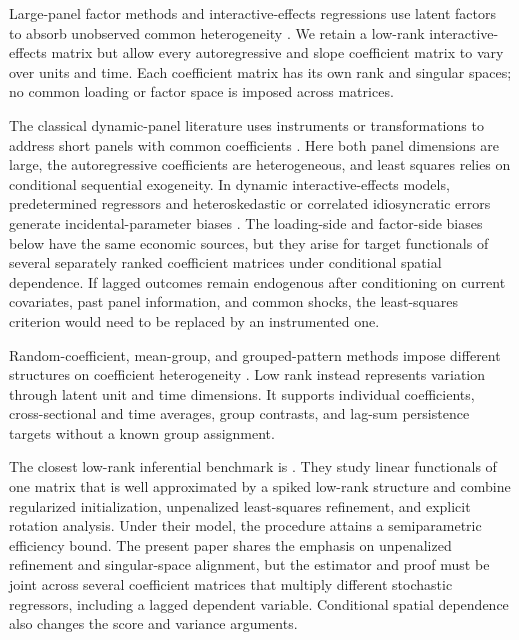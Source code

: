 \documentclass[11pt]{article}
\numberwithin{equation}{section}
\theoremstyle{remark}
\begin{document}
Large-panel factor methods and interactive-effects regressions use latent factors to absorb unobserved common heterogeneity \citep{bai2002,bai2003,pesaran2006,moonweidner2015}. We retain a low-rank interactive-effects matrix but allow every autoregressive and slope coefficient matrix to vary over units and time. Each coefficient matrix has its own rank and singular spaces; no common loading or factor space is imposed across matrices.

The classical dynamic-panel literature uses instruments or transformations to address short panels with common coefficients \citep{andersonhsiao1981,andersonhsiao1982,arellanobond1991}. Here both panel dimensions are large, the autoregressive coefficients are heterogeneous, and least squares relies on conditional sequential exogeneity. In dynamic interactive-effects models, predetermined regressors and heteroskedastic or correlated idiosyncratic errors generate incidental-parameter biases \citep{moonweidner2017}. The loading-side and factor-side biases below have the same economic sources, but they arise for target functionals of several separately ranked coefficient matrices under conditional spatial dependence. If lagged outcomes remain endogenous after conditioning on current covariates, past panel information, and common shocks, the least-squares criterion would need to be replaced by an instrumented one.

Random-coefficient, mean-group, and grouped-pattern methods impose different structures on coefficient heterogeneity \citep{swamy1970,pesaransmith1995,bonhommemanresa2015}. Low rank instead represents variation through latent unit and time dimensions. It supports individual coefficients, cross-sectional and time averages, group contrasts, and lag-sum persistence targets without a known group assignment.

The closest low-rank inferential benchmark is \citet{chernozhukov2023}. They study linear functionals of one matrix that is well approximated by a spiked low-rank structure and combine regularized initialization, unpenalized least-squares refinement, and explicit rotation analysis. Under their model, the procedure attains a semiparametric efficiency bound. The present paper shares the emphasis on unpenalized refinement and singular-space alignment, but the estimator and proof must be joint across several coefficient matrices that multiply different stochastic regressors, including a lagged dependent variable. Conditional spatial dependence also changes the score and variance arguments.
\end{document}
